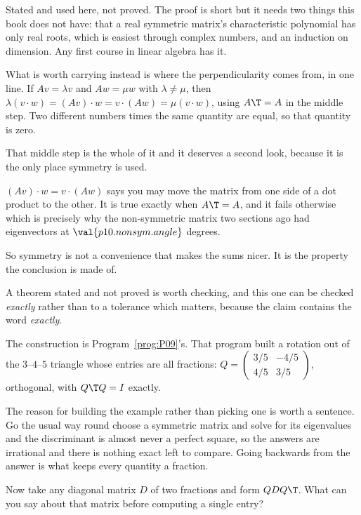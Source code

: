 \begin{rigourbox}
Stated and used here, not proved. The proof is short but it needs two things
this book does not have: that a real symmetric matrix's characteristic
polynomial has only real roots, which is easiest through complex numbers, and
an induction on dimension. Any first course in linear algebra has it.

What is worth carrying instead is where the perpendicularity comes from, in
one line. If $Av = \lambda v$ and $Aw = \mu w$ with $\lambda \ne \mu$, then
$\lambda(v \cdot w) = (Av) \cdot w = v \cdot (Aw) = \mu(v \cdot w)$, using
$A\T = A$ in the middle step. Two different numbers times the same quantity are
equal, so that quantity is zero.
\end{rigourbox}

\begin{fr}
That middle step is the whole of it and it deserves a second look, because it
is the only place symmetry is used.

$(Av) \cdot w = v \cdot (Aw)$ says you may move the matrix from one side of a
dot product to the other. It is true exactly when $A\T = A$, and it fails
otherwise \dash{} which is precisely why the non-symmetric matrix two sections
ago had eigenvectors at $\val{p10.nonsym.angle}$ degrees.

So symmetry is not a convenience that makes the sums nicer. It is the property
the conclusion is made of.
\end{fr}

\begin{fr}
A theorem stated and not proved is worth checking, and this one can be checked
\emph{exactly} rather than to a tolerance \dash{} which matters, because the
claim contains the word \emph{exactly}.

The construction is Program~\ref{prog:P09}'s. That program built a rotation out
of the $3$--$4$--$5$ triangle whose entries are all fractions:
$Q = \begin{pmatrix} 3/5 & -4/5 \\ 4/5 & 3/5 \end{pmatrix}$, orthogonal, with
$Q\T Q = I$ exactly.

The reason for building the example rather than picking one is worth a
sentence. Go the usual way round \dash{} choose a symmetric matrix and solve for
its eigenvalues \dash{} and the discriminant is almost never a perfect square,
so the answers are irrational and there is nothing exact left to compare. Going
backwards from the answer is what keeps every quantity a fraction.

Now take any diagonal matrix $D$ of two fractions and form $Q D Q\T$. What can
you say about that matrix before computing a single entry?
\dotline
\nextframe
\end{fr}


